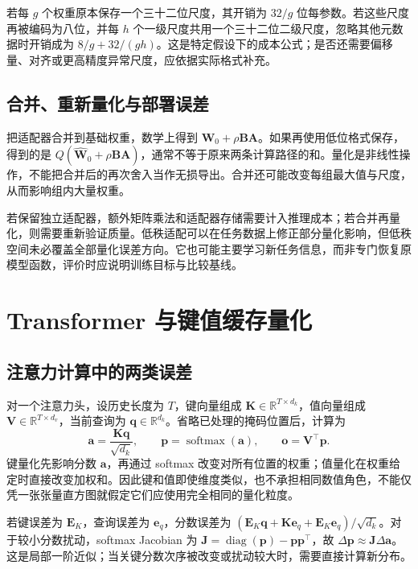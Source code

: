 \documentclass[UTF8,12pt,a4paper,fontset=fandol]{ctexart}
\begin{document}
若每 $g$ 个权重原本保存一个三十二位尺度，其开销为 $32/g$ 位每参数。若这些尺度再被编码为八位，并每 $h$ 个一级尺度共用一个三十二位二级尺度，忽略其他元数据时开销成为 $8/g+32/(gh)$。这是特定假设下的成本公式；是否还需要偏移量、对齐或更高精度异常尺度，应依据实际格式补充。

\subsection{合并、重新量化与部署误差}
把适配器合并到基础权重，数学上得到 $\widehat{\mathbf W}_0+\rho\mathbf B\mathbf A$。如果再使用低位格式保存，得到的是 $Q(\widehat{\mathbf W}_0+\rho\mathbf B\mathbf A)$，通常不等于原来两条计算路径的和。量化是非线性操作，不能把合并后的再次舍入当作无损导出。合并还可能改变每组最大值与尺度，从而影响组内大量权重。

若保留独立适配器，额外矩阵乘法和适配器存储需要计入推理成本；若合并再量化，则需要重新验证质量。低秩适配可以在任务数据上修正部分量化影响，但低秩空间未必覆盖全部量化误差方向。它也可能主要学习新任务信息，而非专门恢复原模型函数，评价时应说明训练目标与比较基线。

\section{Transformer 与键值缓存量化}
\label{sec:quant-kv}

\subsection{注意力计算中的两类误差}
对一个注意力头，设历史长度为 $T$，键向量组成 $\mathbf K\in\mathbb R^{T\times d_k}$，值向量组成 $\mathbf V\in\mathbb R^{T\times d_v}$，当前查询为 $\mathbf q\in\mathbb R^{d_k}$。省略已处理的掩码位置后，计算为
\begin{equation}
 \mathbf a=\frac{\mathbf K\mathbf q}{\sqrt{d_k}},\qquad
 \mathbf p=\operatorname{softmax}(\mathbf a),\qquad
 \mathbf o=\mathbf V^\top\mathbf p.
 \label{eq:quant-attention}
\end{equation}
键量化先影响分数 $\mathbf a$，再通过 softmax 改变对所有位置的权重；值量化在权重给定时直接改变加权和。因此键和值即使维度类似，也不承担相同数值角色，不能仅凭一张张量直方图就假定它们应使用完全相同的量化粒度。

若键误差为 $\mathbf E_K$，查询误差为 $\mathbf e_q$，分数误差为 $(\mathbf E_K\mathbf q+\mathbf K\mathbf e_q+\mathbf E_K\mathbf e_q)/\sqrt{d_k}$。对于较小分数扰动，softmax Jacobian 为 $\mathbf J=\operatorname{diag}(\mathbf p)-\mathbf p\mathbf p^\top$，故 $\Delta\mathbf p\approx\mathbf J\Delta\mathbf a$。这是局部一阶近似；当关键分数次序被改变或扰动较大时，需要直接计算新分布。
\end{document}
